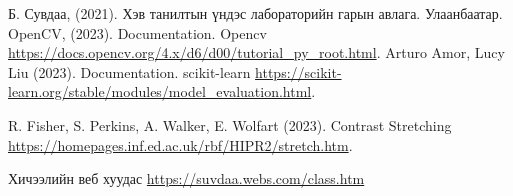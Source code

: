 \begin{thebibliography}{}
	Б. Сувдаа, (2021). Хэв танилтын үндэс лабораторийн гарын авлага. Улаанбаатар.
	OpenCV, (2023). Documentation. Opencv \url{https://docs.opencv.org/4.x/d6/d00/tutorial_py_root.html}.
	Arturo Amor, Lucy Liu
	(2023). Documentation. scikit-learn \url{https://scikit-learn.org/stable/modules/model_evaluation.html}.

	R. Fisher,
	S. Perkins,
	A. Walker,
	E. Wolfart
	(2023). Contrast Stretching \url{https://homepages.inf.ed.ac.uk/rbf/HIPR2/stretch.htm}.

	Хичээлийн веб хуудас
	\url{https://suvdaa.webs.com/class.htm}

\end{thebibliography}